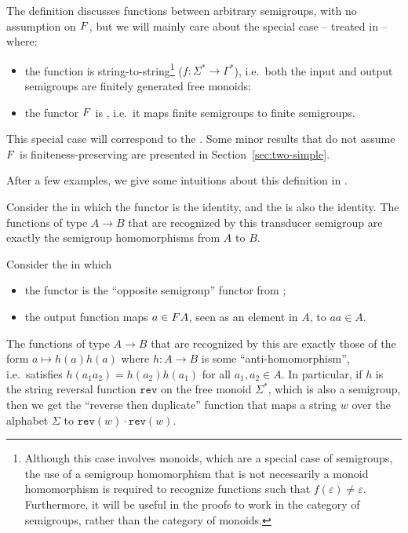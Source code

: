 \AP The definition discusses functions between arbitrary semigroups, with no
assumption on $\functor$, but we will
mainly care about the special case -- treated in  -- where:
\begin{itemize}
\item the function is string-to-string\footnote{Although this case involves monoids,
    which are a special case of semigroups, the use of a semigroup homomorphism that
    is not necessarily a monoid homomorphism is required to recognize functions such
    that $f(\varepsilon)\neq\varepsilon$. Furthermore, it will be useful in the
    proofs to work in the category of semigroups, rather than the category of monoids.} ($f\colon\Sigma^*\to\Gamma^*$), i.e.\
  both the input and output semigroups are finitely generated free monoids;
\item the functor $\functor$ is
  , i.e.~it maps finite semigroups to finite
  semigroups.
\end{itemize}
This special case will correspond to the . Some
minor results that do not assume $\functor$ is finiteness-preserving are presented in Section~\ref{sec:two-simple}.

After a few examples, we give some intuitions about this definition in .

\begin{example}
 Consider the  in which the functor is the identity, and the  is also the identity. The functions of type $A \to B$ that are recognized by this transducer semigroup are exactly the semigroup homomorphisms from $A$ to $B$.
\end{example}

\begin{example}\label{ex:reverse-duplicate}
  Consider the  in which
  \begin{itemize}
  \item the functor is the \enquote{opposite semigroup} functor from
    \Cref{ex:functors};
  \item the output function maps $a\in\functor A$, seen as an element in $A$, to
    $aa \in A$.
  \end{itemize}
  The functions of type $A \to B$ that are recognized by this  are exactly those of the form $a \mapsto h(a)h(a)$ where $h\colon A
  \to B$ is some \enquote{anti-homomorphism}, i.e.\ satisfies
  $h(a_1a_2)=h(a_2)h(a_1)$ for all $a_1,a_2\in A$. In particular, if $h$ is the
  string reversal function $\mathtt{rev}$ on the free monoid $\Sigma^*$, which
  is also a semigroup, then we get the \enquote{reverse then duplicate} function
  that maps a string $w$ over the alphabet $\Sigma$ to $\mathtt{rev}(w) \cdot
  \mathtt{rev}(w)$.
\end{example}

